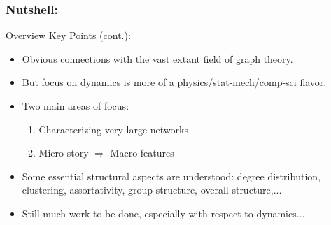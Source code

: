 \begin{frame}[label=]
  \frametitle{Nutshell:}

  \begin{block}{Overview Key Points (cont.):}
    \begin{itemize}
    \item<1->
      Obvious connections with the vast
      extant field of graph theory.
    \item<2->
      But focus on dynamics is more of a physics/stat-mech/comp-sci
      flavor.
    \item<3->
      Two main areas of focus:
      \begin{enumerate}
      \item 
         Characterizing very large networks
      \item
         Micro story $\Rightarrow$ Macro features
      \end{enumerate}
    \item<4->
      Some essential structural aspects are understood: degree distribution, clustering,
      assortativity, group structure, overall structure,...
    \item<5->
      Still much work to be done, especially with respect to dynamics...
    \end{itemize}
    
  \end{block}

\end{frame}
